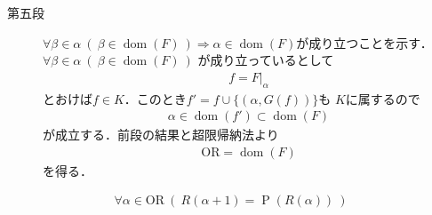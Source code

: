\begin{prf}
\begin{description}
			\item[第五段] $\forall \beta \in \alpha\ (\ \beta \in \operatorname{dom}(F)\ )
				\Longrightarrow \alpha \in \operatorname{dom}(F)$が成り立つことを示す．
				$\forall \beta \in \alpha\ (\ \beta \in \operatorname{dom}(F)\ )$
				が成り立っているとして
				\begin{align}
					f = F|_\alpha
				\end{align}
				とおけば$f \in K$．このとき$f' = f \cup \{(\alpha,G(f))\}$も
				$K$に属するので
				\begin{align}	
					\alpha \in \operatorname{dom}(f') \subset
					\operatorname{dom}(F)
				\end{align}
				が成立する．前段の結果と超限帰納法より
				\begin{align}
					\mathrm{OR} = \operatorname{dom}(F)
				\end{align}
				を得る．
		\end{description}
	\end{prf}
	
	\begin{screen}
		\begin{thm}
			\begin{align}\label{thm:R_alpha_plus_1_equals_to_power_of_R_alpha}
				\forall \alpha \in \mathrm{OR}\ 
				\left(\ R(\alpha + 1) = \operatorname{P}(R(\alpha))\ \right)
			\end{align}
		\end{thm}
	\end{screen}
	
